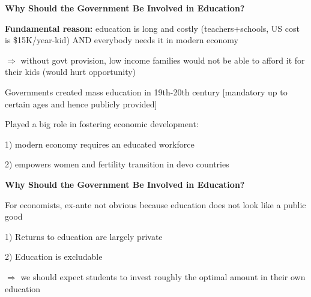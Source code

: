 \documentclass[landscape]{slides}
\begin{document}
\begin{slide}

\end{slide}





\begin{slide}
\begin{center}
{\bf Why Should the Government Be Involved in Education?}
\end{center}

\textbf{Fundamental reason:} education is long and costly (teachers+schools, US cost is \$15K/year-kid)
AND everybody needs it in modern economy 

$\Rightarrow$ without govt provision, low income families would not be able to afford it for their kids
(would hurt opportunity)

Governments created mass education in 19th-20th century [mandatory up to certain ages and 
hence publicly provided]

Played a big role in fostering economic development:

1) modern economy requires an educated workforce

2) empowers women and fertility transition in devo countries
	
	
\end{slide}


\begin{slide}

\end{slide}


\begin{slide}
\begin{center}
{\bf Why Should the Government Be Involved in Education?}
\end{center}

For economists, ex-ante not obvious because education does not look like a public good

1) Returns to education are largely private

2) Education is excludable

$\Rightarrow$ we should expect students to invest roughly the optimal amount in their own education

\end{slide}
\end{document}

